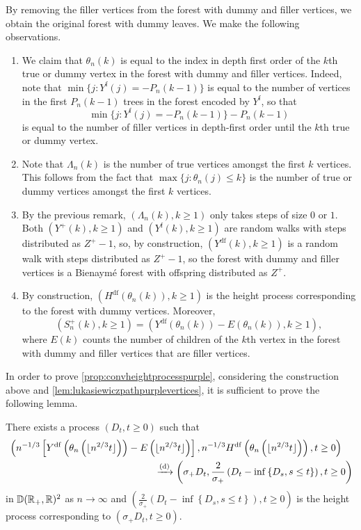 By removing the filler vertices from the forest with dummy and filler vertices, we obtain the original forest with dummy leaves. We make the following observations.
\begin{enumerate}
    \item We claim that $\theta_n(k)$ is equal to the index in depth first order of the $k$th true or dummy vertex in the forest with dummy and filler vertices. Indeed, note that $\min\{j: Y^{\mathrm{f}}(j)=-P_n(k-1)\}$ is equal to the number of vertices in the first $P_n(k-1)$ trees in the forest encoded by $Y^{\mathrm{f}}$, so that $$\min\{j: Y^{\mathrm{f}}(j)=-P_n(k-1)\}-P_n(k-1)$$ is equal to the number of filler vertices in depth-first order until the $k$th true or dummy vertex. 
    \item Note that $\Lambda_n(k)$ is the number of true vertices amongst the first $k$ vertices. This follows from the fact that $\max\{j:\theta_n(j)\leq k\}$ is the number of true or dummy vertices amongst the first $k$ vertices. 
    \item By the previous remark, $(\Lambda_n(k),k\geq 1)$ only takes steps of size $0$ or $1$. Both $(Y^+(k),k\geq 1)$ and $(Y^{\mathrm{f}}(k),k\geq 1)$ are random walks with steps distributed as $Z^+-1$, so, by construction, $(Y^{\mathrm{df}}(k),k\geq 1)$ is a random walk with steps distributed as $Z^+-1$, so the forest with dummy and filler vertices is a Bienaymé forest with offspring distributed as $Z^+$.
    \item By construction, $(H^{\mathrm{df}}(\theta_n(k)),k\geq 1)$ is the height process corresponding to the forest with dummy vertices. Moreover,
   \begin{equation}\label{eq.constructionSp}(S^{+}_n(k),k\geq 1)=(Y^{\mathrm{df}}(\theta_n(k))-E(\theta_n(k)),k\geq 1),\end{equation}
    where 
    $E(k)$ counts the number of children of the $k$th vertex in the forest with dummy and filler vertices that are filler vertices.
\end{enumerate}
In order to prove \cref{prop:convheightprocesspurple}, considering the construction above and \cref{lem:lukasiewiczpathpurplevertices}, it is sufficient to prove the following lemma.
\begin{lemma}\label{lem:heightprocessblackpurplered}
There exists a process $(D_t,t\geq 0)$ such that 
\begin{align*}
    &\left(n^{-1/3}\left[Y^{\mathrm{df}}\left(\theta_n\left(\lfloor n^{2/3}t\rfloor \right)\right)-E\left(\lfloor n^{2/3}t\rfloor \right)\right], n^{-1/3}H^{\mathrm{df}}\left(\theta_n\left(\lfloor n^{2/3}t\rfloor \right)\right),t\geq 0\right)\\
    &\hspace{15em}\todist\left(\sigma_+D_t,\frac{2}{\sigma_+}\left(D_t-\inf\left\{D_s,s\leq t\right\}\right),t\geq 0\right)
\end{align*}
in ${\mathbb D}({\mathbb R}_+,{\mathbb R})^2$ as $n\to \infty$ and $\left(\frac{2}{\sigma_+}\left(D_t-\inf\left\{D_s,s\leq t\right\}\right),t\geq 0\right)$ is the height process corresponding to $(\sigma_+D_t,t\geq 0)$.
\end{lemma} 

